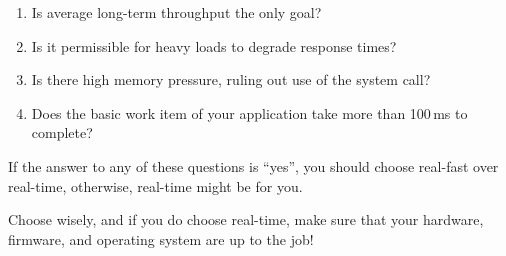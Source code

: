 \begin{enumerate}
\item	Is average long-term throughput the only goal?
\item	Is it permissible for heavy loads to degrade response times?
\item	Is there high memory pressure, ruling out use of
	the  system call?
\item	Does the basic work item of your application take more than
	100\,ms to complete?
\end{enumerate}

If the answer to any of these questions is ``yes'', you should choose
real-fast over real-time, otherwise, real-time might be for you.

Choose wisely, and if you do choose real-time, make sure that your
hardware, firmware, and operating system are up to the job!
